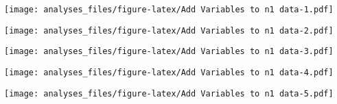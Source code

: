 \documentclass[]{article}
\newenvironment{Shaded}{\begin{snugshade}}{\end{snugshade}}
\newcommand{\KeywordTok}[1]{\textcolor[rgb]{0.13,0.29,0.53}{\textbf{#1}}}
\newcommand{\DataTypeTok}[1]{\textcolor[rgb]{0.13,0.29,0.53}{#1}}
\newcommand{\DecValTok}[1]{\textcolor[rgb]{0.00,0.00,0.81}{#1}}
\newcommand{\FloatTok}[1]{\textcolor[rgb]{0.00,0.00,0.81}{#1}}
\newcommand{\StringTok}[1]{\textcolor[rgb]{0.31,0.60,0.02}{#1}}
\newcommand{\OperatorTok}[1]{\textcolor[rgb]{0.81,0.36,0.00}{\textbf{#1}}}
\newcommand{\NormalTok}[1]{#1}
\begin{document}
\texttt{[image: analyses\_files/figure-latex/Add Variables to n1 data-1.pdf]}

\begin{Shaded}
\end{Shaded}

\texttt{[image: analyses\_files/figure-latex/Add Variables to n1 data-2.pdf]}

\begin{Shaded}
\end{Shaded}

\texttt{[image: analyses\_files/figure-latex/Add Variables to n1 data-3.pdf]}

\begin{Shaded}
\end{Shaded}

\texttt{[image: analyses\_files/figure-latex/Add Variables to n1 data-4.pdf]}

\begin{Shaded}
\end{Shaded}

\texttt{[image: analyses\_files/figure-latex/Add Variables to n1 data-5.pdf]}

\begin{Shaded}
\end{Shaded}
\end{document}
